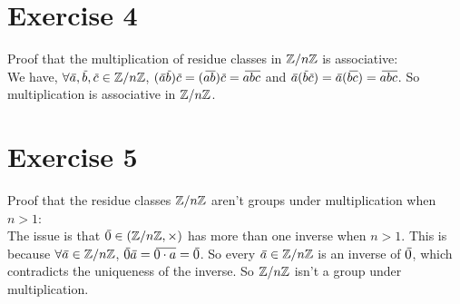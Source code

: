 \documentclass[12pt]{article}
\begin{document}
    \section*{Exercise 4}
    Proof that the multiplication of residue classes
    in $\mathbb{Z}/n\mathbb{Z}$ is associative: \\
    We have, $\forall \,\overline{\!{a}}, \,\overline{\!{b}}, \,\overline{\!{c}} \in \mathbb{Z}/n\mathbb{Z}$,
    $(\,\overline{\!{a}}\,\overline{\!{b}})\,\overline{\!{c}}
    = (\,\overline{\!{ab}})\,\overline{\!{c}} 
    = \,\overline{\!{abc}}$ 
    and $\,\overline{\!{a}}(\,\overline{\!{b}}\,\overline{\!{c}})
    = \,\overline{\!{a}}(\,\overline{\!{bc}})
    = \,\overline{\!{abc}}$.
    So multiplication is associative in $\mathbb{Z}/n\mathbb{Z}$.
    

    \section*{Exercise 5}
    Proof that the residue classes $\mathbb{Z}/n\mathbb{Z}$ aren't groups under multiplication
    when $n > 1$: \\
    The issue is that $\,\overline{\!{0}} \in (\mathbb{Z}/n\mathbb{Z}, \times)$ has more than one inverse
    when $n > 1$.
    This is because $\forall \,\overline{\!{a}} \in \mathbb{Z}/n\mathbb{Z}$,
    $\,\overline{\!{0}}\,\overline{\!{a}} = \,\overline{\!{0 \cdot a}} = \,\overline{\!{0}}$.
    So every $\,\overline{\!{a}} \in \mathbb{Z}/n\mathbb{Z}$ is an inverse of $\,\overline{\!{0}}$,
    which contradicts the uniqueness of the inverse.
    So $\mathbb{Z}/n\mathbb{Z}$ isn't a group under multiplication.
\end{document}
